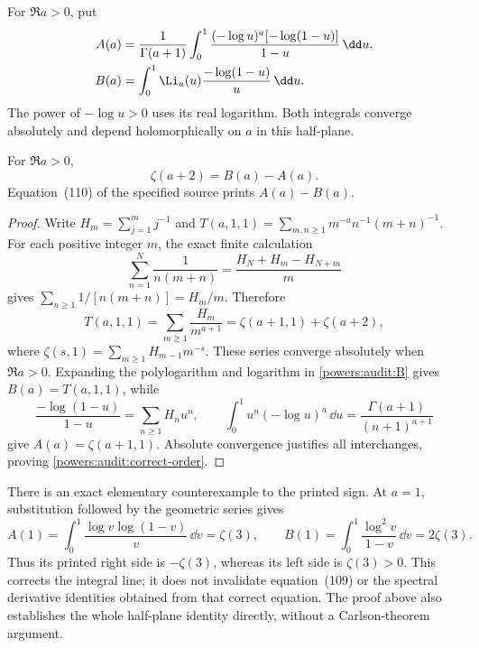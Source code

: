 For \(\Re a>0\), put
\begin{align}
 A(a)&=\frac1{\Gamma(a+1)}\int_0^1
       \frac{(-\log u)^a[-\log(1-u)]}{1-u}\,\dd u,
       \label{powers:audit:A}\\
 B(a)&=\int_0^1\Li_a(u)
                  \frac{-\log(1-u)}u\,\dd u.
       \label{powers:audit:B}
\end{align}
The power of \(-\log u>0\) uses its real logarithm. Both integrals
converge absolutely and depend holomorphically on \(a\) in this
half-plane.

\begin{proposition}
\label{powers:audit:BB-correction}
For \(\Re a>0\),
\begin{equation}
 \boxed{\displaystyle
 \zeta(a+2)=B(a)-A(a).}
 \label{powers:audit:correct-order}
\end{equation}
Equation~(110) of the specified source prints \(A(a)-B(a)\).
\end{proposition}

\begin{proof}
Write \(H_m=\sum_{j=1}^m j^{-1}\) and
\(T(a,1,1)=\sum_{m,n\ge1}m^{-a}n^{-1}(m+n)^{-1}\).
For each positive integer \(m\), the exact finite calculation
\[
 \sum_{n=1}^N\frac1{n(m+n)}
 =\frac{H_N+H_m-H_{N+m}}m
\]
gives \(\sum_{n\ge1}1/[n(m+n)]=H_m/m\). Therefore
\begin{equation}
 T(a,1,1)=\sum_{m\ge1}\frac{H_m}{m^{a+1}}
         =\zeta(a+1,1)+\zeta(a+2),
 \label{powers:audit:direct-T}
\end{equation}
where \(\zeta(s,1)=\sum_{m\ge1}H_{m-1}m^{-s}\).
These series converge absolutely when \(\Re a>0\).
Expanding the polylogarithm and logarithm in
\eqref{powers:audit:B} gives \(B(a)=T(a,1,1)\), while
\[
 \frac{-\log(1-u)}{1-u}=\sum_{n\ge1}H_nu^n,
 \qquad
 \int_0^1u^n(-\log u)^a\,\dd u
       =\frac{\Gamma(a+1)}{(n+1)^{a+1}}
\]
give \(A(a)=\zeta(a+1,1)\). Absolute convergence justifies all
interchanges, proving \eqref{powers:audit:correct-order}.
\end{proof}

There is an exact elementary counterexample to the printed sign.
At \(a=1\), substitution followed by the geometric series gives
\[
 A(1)=\int_0^1\frac{\log v\log(1-v)}v\,\dd v=\zeta(3),
 \qquad
 B(1)=\int_0^1\frac{\log^2v}{1-v}\,\dd v=2\zeta(3).
\]
Thus its printed right side is \(-\zeta(3)\), whereas its left
side is \(\zeta(3)>0\). This corrects the integral line; it does
not invalidate equation~(109) or the spectral derivative identities
obtained from that correct equation. The proof above also establishes
the whole half-plane identity directly, without a Carlson-theorem
argument.

